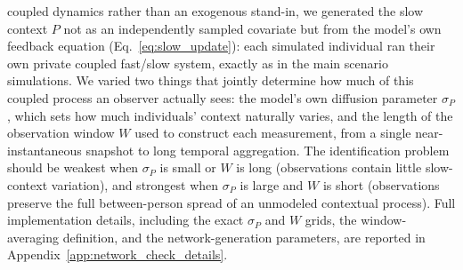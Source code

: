 \documentclass[man,12pt,floatsintext]{apa7}
\begin{document}
coupled dynamics rather than an exogenous stand-in, we generated the slow context \(P\) not as an
independently sampled covariate but from the model's own feedback equation
(Eq.~\eqref{eq:slow_update}): each simulated individual ran their own private coupled fast/slow
system, exactly as in the main scenario simulations. We varied two things that jointly determine
how much of this coupled process an observer actually sees: the model's own diffusion parameter
\(\sigma_P\), which sets how much individuals' context naturally varies, and the length of the
observation window \(W\) used to construct each measurement, from a single near-instantaneous
snapshot to long temporal aggregation. The identification problem should be weakest when
\(\sigma_P\) is small or \(W\) is long (observations contain little slow-context variation), and
strongest when \(\sigma_P\) is large and \(W\) is short (observations preserve the full
between-person spread of an unmodeled contextual process). Full implementation details, including
the exact \(\sigma_P\) and \(W\) grids, the window-averaging definition, and the network-generation
parameters, are reported in Appendix~\ref{app:network_check_details}.
\end{document}
